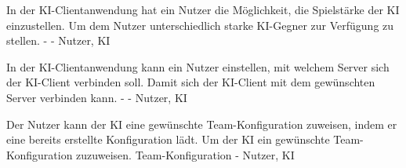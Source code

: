         {In der KI-Clientanwendung hat ein Nutzer die Möglichkeit, die Spielstärke der KI einzustellen.}
        {Um dem Nutzer unterschiedlich starke KI-Gegner zur Verfügung zu stellen.}
        {-}
        {-}
        {Nutzer, KI}
        
        {In der KI-Clientanwendung kann ein Nutzer einstellen, mit welchem Server sich der KI-Client verbinden soll.}
        {Damit sich der KI-Client mit dem gewünschten Server verbinden kann.}
        {-}
        {-}
        {Nutzer, KI}

        {Der Nutzer kann der KI eine gewünschte Team-Konfiguration zuweisen, indem er eine bereits erstellte Konfiguration lädt.}
        {Um der KI ein gewünschte Team-Konfiguration zuzuweisen.}
        {Team-Konfiguration}
        {-}
        {Nutzer, KI}
